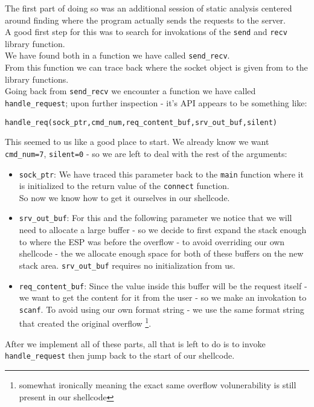 \documentclass{article}
\begin{document}
The first part of doing so was an additional session of static analysis
centered around finding where the program actually sends the requests to the server.\\
A good first step for this was to search for invokations of the \texttt{send} and \texttt{recv}
library function.\\
We have found both in a function we have called \texttt{send\_recv}.\\
From this function we can trace back where the socket object
is given from to the library functions.\\
Going back from \texttt{send\_recv}
we encounter a function we have called \texttt{handle\_request};
upon further inspection - it's API appears to be something like:
\begin{lstlisting}
handle_req(sock_ptr,cmd_num,req_content_buf,srv_out_buf,silent)
\end{lstlisting}
This seemed to us like a good place to start.
We already know we want \texttt{cmd\_num=7}, \texttt{silent=0} -
so we are left to deal with the rest of the arguments:
\begin{itemize}
    \item \texttt{sock\_ptr}: We have traced this parameter back to the \texttt{main} function
    where it is initialized to the return value of the \texttt{connect} function.\\
    So now we know how to get it ourselves in our shellcode.
    \item \texttt{srv\_out\_buf}: For this and the following parameter we
    notice that we will need to allocate a large buffer - so we decide to
    first expand the stack enough to where the ESP was before the overflow -
    to avoid overriding our own shellcode - the we allocate enough space for
    both of these buffers on the new stack area. \texttt{srv\_out\_buf} requires no initialization from us.
    \item \texttt{req\_content\_buf}: Since the value inside this buffer will be the request
    itself - we want to get the content for it from the user - so we make an invokation to \texttt{scanf}.
    To avoid using our own format string - we use the same format string that created the original
    overflow
    \footnote{somewhat ironically meaning the exact same overflow volunerability is still present in our shellcode}.
\end{itemize}

After we implement all of these parts, all that is left to do is to invoke
\texttt{handle\_request} then jump back to the start of our shellcode.\\
\end{document}
